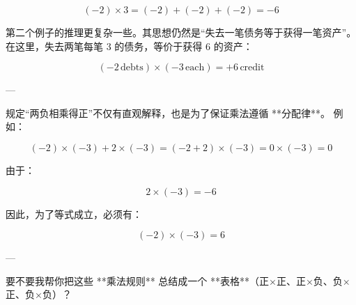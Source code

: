 $$
(-2) \times 3 = (-2) + (-2) + (-2) = -6
$$

第二个例子的推理更复杂一些。其思想仍然是“失去一笔债务等于获得一笔资产”。
在这里，失去两笔每笔 3 的债务，等价于获得 6 的资产：

$$
(-2 \,\text{debts}) \times (-3 \,\text{each}) = +6 \,\text{credit}
$$

---

规定“两负相乘得正”不仅有直观解释，也是为了保证乘法遵循 **分配律**。
例如：

$$
(-2) \times (-3) + 2 \times (-3) = (-2 + 2) \times (-3) = 0 \times (-3) = 0
$$

由于：

$$
2 \times (-3) = -6
$$

因此，为了等式成立，必须有：

$$
(-2) \times (-3) = 6
$$

---

要不要我帮你把这些 **乘法规则** 总结成一个 **表格**（正×正、正×负、负×正、负×负）？
